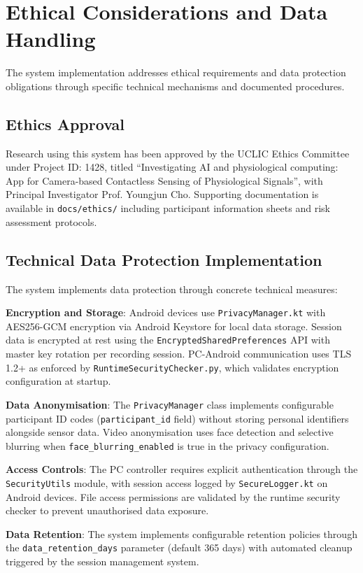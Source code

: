 \section{Ethical Considerations and Data Handling}\label{sec:4-7}
The system implementation addresses ethical requirements and data protection obligations through specific technical mechanisms and documented procedures.

\subsection{Ethics Approval}
Research using this system has been approved by the UCLIC Ethics Committee under Project ID: 1428, titled ``Investigating AI and physiological computing: App for Camera-based Contactless Sensing of Physiological Signals'', with Principal Investigator Prof. Youngjun Cho. Supporting documentation is available in \texttt{docs/ethics/} including participant information sheets and risk assessment protocols.

\subsection{Technical Data Protection Implementation}
The system implements data protection through concrete technical measures:

\textbf{Encryption and Storage}: Android devices use \texttt{PrivacyManager.kt} with AES256-GCM encryption via Android Keystore for local data storage. Session data is encrypted at rest using the \texttt{EncryptedSharedPreferences} API with master key rotation per recording session. PC-Android communication uses TLS 1.2+ as enforced by \texttt{RuntimeSecurityChecker.py}, which validates encryption configuration at startup.

\textbf{Data Anonymisation}: The \texttt{PrivacyManager} class implements configurable participant ID codes (\texttt{participant\_id} field) without storing personal identifiers alongside sensor data. Video anonymisation uses face detection and selective blurring when \texttt{face\_blurring\_enabled} is true in the privacy configuration.

\textbf{Access Controls}: The PC controller requires explicit authentication through the \texttt{SecurityUtils} module, with session access logged by \texttt{SecureLogger.kt} on Android devices. File access permissions are validated by the runtime security checker to prevent unauthorised data exposure.

\textbf{Data Retention}: The system implements configurable retention policies through the \texttt{data\_retention\_days} parameter (default 365 days) with automated cleanup triggered by the session management system.

